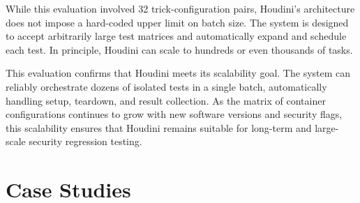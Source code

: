 \documentclass[12pt]{report}
\begin{document}
\begin{doublespace}
While this evaluation involved 32 trick-configuration pairs, Houdini’s architecture does not impose a hard-coded upper limit on batch size. The system is designed to accept arbitrarily large test matrices and automatically expand and schedule each test. In principle, Houdini can scale to hundreds or even thousands of tasks.

This evaluation confirms that Houdini meets its scalability goal. The system can reliably orchestrate dozens of isolated tests in a single batch, automatically handling setup, teardown, and result collection. As the matrix of container configurations continues to grow with new software versions and security flags, this scalability ensures that Houdini remains suitable for long-term and large-scale security regression testing.

\end{doublespace} 	\chapter{Case Studies}
\fontsize{12pt}{14pt} \selectfont
\end{document}
